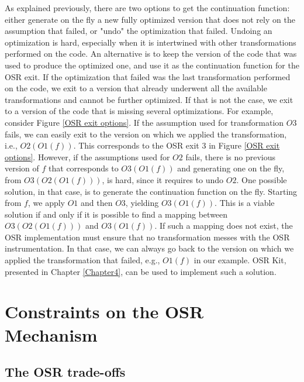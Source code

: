 As explained previously, there are two options to get the continuation function: either generate on the fly a new fully optimized version that does not rely on the assumption that failed, or "undo" the optimization that failed.
Undoing an optimization is hard, especially when it is intertwined with other transformations performed on the code.
An alternative is to keep the version of the code that was used to produce the optimized one, and use it as the continuation function for the OSR exit.
If the optimization that failed was the last transformation performed on the code, we exit to a version that already underwent all the available transformations and cannot be further optimized.
If that is not the case, we exit to a version of the code that is missing several optimizations.
For example, consider Figure \ref{OSR exit options}. 
If the assumption used for transformation $O3$ fails, we can easily exit to the version on which we applied the transformation, i.e., $O2(O1(f))$.
This corresponds to the OSR exit 3 in Figure \ref{OSR exit options}.
However, if the assumptions used for $O2$ fails, there is no previous version of $f$ that corresponds to $O3(O1(f))$ and generating one on the fly, from $O3(O2(O1(f)))$, is hard, since it requires to undo $O2$.
One possible solution, in that case, is to generate the continuation function on the fly.
Starting from $f$, we apply $O1$ and then $O3$, yielding $O3(O1(f))$.
This is a viable solution if and only if it is possible to find a mapping between $O3(O2(O1(f)))$ and $O3(O1(f))$.
If such a mapping does not exist, the OSR implementation must ensure that no transformation messes with the OSR instrumentation.
In that case, we can always go back to the version on which we applied the transformation that failed, e.g., $O1(f)$ in our example.
OSR Kit, presented in Chapter \ref{Chapter4}, can be used to implement such a solution.\\

\section{Constraints on the OSR Mechanism}
\subsection{The OSR trade-offs}

